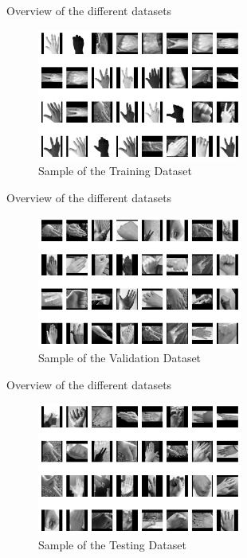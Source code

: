 \documentclass[aspectratio=169]{beamer}
\begin{document}
{    \begin{frame}{Overview of the different datasets}
        \begin{figure}
            \centering
            \includegraphics[width=0.6\textwidth]{img/trainloader.png}
            \caption{Sample of the Training Dataset}
        \end{figure}
    \end{frame}

    \begin{frame}{Overview of the different datasets}
        \begin{figure}
            \centering
            \includegraphics[width=0.6\textwidth]{img/validationloader.png}
            \caption{Sample of the Validation Dataset}
        \end{figure}
    \end{frame}

    \begin{frame}{Overview of the different datasets}
        \begin{figure}
            \centering
            \includegraphics[width=0.6\textwidth]{img/testloader.png}
            \caption{Sample of the Testing Dataset}
        \end{figure}
    \end{frame}
    
}
\end{document}
